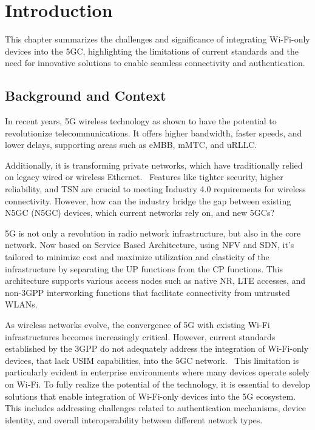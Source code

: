 \chapter{Introduction}%
\label{chapter:introduction}

\begin{introduction}
This chapter summarizes the challenges and significance of integrating Wi-Fi-only devices into the \acl{5GC}, highlighting the limitations of current standards and the need for innovative solutions to enable seamless connectivity and authentication.
\end{introduction}

\section{Background and Context}

In recent years, \ac{5G} wireless technology as shown to have the potential to revolutionize telecommunications. It offers higher bandwidth, faster speeds, and lower delays, supporting areas such as \ac{eMBB}, \ac{mMTC}, and \ac{uRLLC}.

Additionally, it is transforming private networks, which have traditionally relied on legacy wired or wireless Ethernet.~\cite{altice-01-p3} Features like tighter security, higher reliability, and \ac{TSN} are crucial to meeting Industry 4.0 requirements for wireless connectivity. However, how can the industry bridge the gap between existing \acl{N5GC} (\ac{N5GC}) devices, which current networks rely on, and new \acp{5GC}?

\ac{5G} is not only a revolution in radio network infrastructure, but also in the core network. Now based on Service Based Architecture, using \ac{NFV} and \ac{SDN}, it's tailored to minimize cost and maximize utilization and elasticity of the infrastructure by separating the \ac{UP} functions from the \ac{CP} functions. This architecture supports various access nodes such as native \ac{NR}, LTE accesses, and non-\ac{3GPP} interworking functions that facilitate connectivity from untrusted WLANs.~\cite{23.501-p41}

As wireless networks evolve, the convergence of 5G with existing Wi-Fi infrastructures becomes increasingly critical. However, current standards established by the \ac{3GPP} do not adequately address the integration of Wi-Fi-only devices, that lack \ac{USIM} capabilities, into the \ac{5GC} network.~\cite{wba-04-2021-p59} This limitation is particularly evident in enterprise environments where many devices operate solely on Wi-Fi. To fully realize the potential of the technology, it is essential to develop solutions that enable integration of Wi-Fi-only devices into the \ac{5G} ecosystem. This includes addressing challenges related to authentication mechanisms, device identity, and overall interoperability between different network types.

